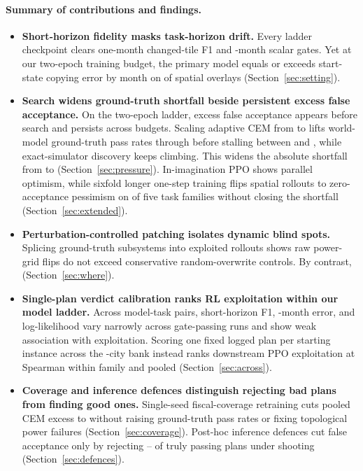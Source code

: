 \paragraph{Summary of contributions and findings.}
\begin{itemize}
\item \textbf{Short-horizon fidelity masks task-horizon drift.} Every ladder checkpoint clears one-month changed-tile F1 and \RollA-month scalar gates. Yet at our two-epoch training budget, the primary \SizeM{} model equals or exceeds start-state copying error by month \Horizon{} on \HorRestN{} of \HorOverlays{} spatial overlays (Section~\ref{sec:setting}).
\item \textbf{Search widens ground-truth shortfall beside persistent excess false acceptance.} On the two-epoch ladder, excess false acceptance appears before search and persists across budgets. Scaling adaptive CEM from  to  lifts world-model ground-truth pass rates through  before stalling between  and , while exact-simulator discovery keeps climbing. This widens the absolute shortfall from \PaTenShort{} to \PaTenThouShort{} (Section~\ref{sec:pressure})\RpFindClause{}. In-imagination PPO shows parallel optimism, while sixfold longer one-step training flips spatial rollouts to zero-acceptance pessimism on \ExtTrZeroAccFams{} of five task families without closing the  shortfall (Section~\ref{sec:extended}).
\item \textbf{Perturbation-controlled patching isolates dynamic blind spots.} Splicing ground-truth subsystems into exploited rollouts shows raw power-grid flips do not exceed conservative random-overwrite controls. By contrast, \FireFindingSentence{} (Section~\ref{sec:where}).
\item \textbf{Single-plan verdict calibration ranks RL exploitation within our model ladder.} Across \AcPairs{} model-task pairs, short-horizon F1, \RollA-month error, and log-likelihood vary narrowly across gate-passing runs and show weak association with exploitation. Scoring one fixed logged plan per starting instance across the \AllCities-city bank instead ranks downstream PPO exploitation at Spearman \AcEOneWithin{} within family and \AcEOneRho{} pooled (Section~\ref{sec:across}).
\item \textbf{Coverage and inference defences distinguish rejecting bad plans from finding good ones.} Single-seed fiscal-coverage retraining cuts pooled CEM excess to \CovAdAllCovExcess{} \ci{\CovAdAllCovExcessCI} without raising ground-truth pass rates or fixing topological power failures (Section~\ref{sec:coverage}). Post-hoc inference defences cut false acceptance only by rejecting \DefSigFalseRejMin{}--\DefSigFalseRejMax{} of truly passing plans under shooting (Section~\ref{sec:defences}).
\end{itemize}
